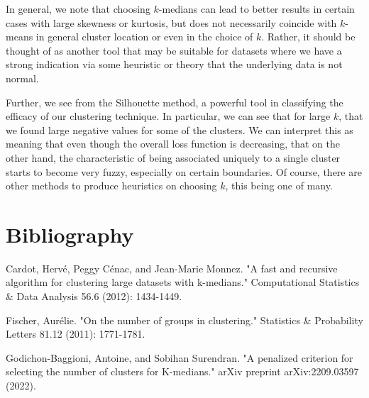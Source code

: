 \documentclass[sn-mathphys,Numbered]{sn-jnl}
\begin{document}
In general, we note that choosing $k$-medians can lead to better results in certain cases with large skewness or kurtosis, but does not necessarily coincide with $k$-means in general cluster location or even in the choice of $k$. Rather, it should be thought of as another tool that may be suitable for datasets where we have a strong indication via some heuristic or theory that the underlying data is not normal.

Further, we see from the Silhouette method, a powerful tool in classifying the efficacy of our clustering technique. In particular, we can see that for large $k$, that we found large negative values for some of the clusters. We can interpret this as meaning that even though the overall loss function is decreasing, that on the other hand, the characteristic of being associated uniquely to a single cluster starts to become very fuzzy, especially on certain boundaries. Of course, there are other methods to produce heuristics on choosing $k$, this being one of many.

\section{Bibliography}

Cardot, Hervé, Peggy Cénac, and Jean-Marie Monnez. "A fast and recursive algorithm for clustering large datasets with k-medians." Computational Statistics \& Data Analysis 56.6 (2012): 1434-1449.

Fischer, Aurélie. "On the number of groups in clustering." Statistics \& Probability Letters 81.12 (2011): 1771-1781.

Godichon-Baggioni, Antoine, and Sobihan Surendran. "A penalized criterion for selecting the number of clusters for K-medians." arXiv preprint arXiv:2209.03597 (2022).
\end{document}
